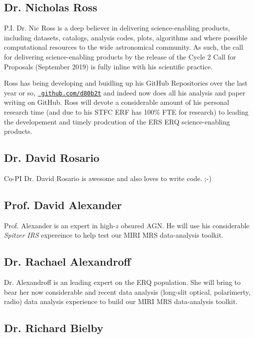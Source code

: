 \subsection*{Dr. Nicholas Ross}
P.I. Dr. Nic Ross is a deep believer in delivering science-enabling
products, including datasets, catalogs, analysis codes, plots,
algorithms and where possible computational resources to the wide
astronomical community.  As such, the call for delivering
science-enabling products by the release of the Cycle 2 Call for
Proposals (September 2019) is fully inline with his scientific
practice.

\smallskip \smallskip
\noindent
Ross has being developing and buidling up his GitHub Repositories over
the last year or so, \href{https://github.com/d80b2t}{\tt
github.com/d80b2t} and indeed now does all his analysis and paper
writing on GitHub.
Ross will devote a considerable amount of his personal research time
(and due to his STFC ERF has 100\% FTE for research) to leading the
developement and timely prodcution of the ERS ERQ science-enabling
products.


\subsection*{Dr. David Rosario} 
Co-PI Dr. David Rosario is awesome and also loves to write code. ;-)


\subsection*{Prof. David Alexander} 
Prof. Alexander is an expert in high-$z$ obsured AGN.  He will use his
considerable {\it Spitzer IRS} expereince to help test our MIRI MRS
data-analysis toolkit.


\subsection*{Dr. Rachael Alexandroff} 
Dr. Alexandroff is an leading expert on the ERQ population.  She will
bring to bear her now considerable and recent data analysis (long-slit
optical, polarimerty, radio) data analysis experience to build our
MIRI MRS data-analysis toolkit.


\subsection*{Dr. Richard Bielby}


\iffalse
\subsection*{Prof. Beth Biller}
Prof. Biller is an expert in infrared coronagraphic observations. 
While we do not intend to use the MIRI coronagraphs in this proposal, 
longer term observations would potentially involve observing the ERQs
with the Lyot or 4QPM if this became appropriate and technically feasible. 
\fi


